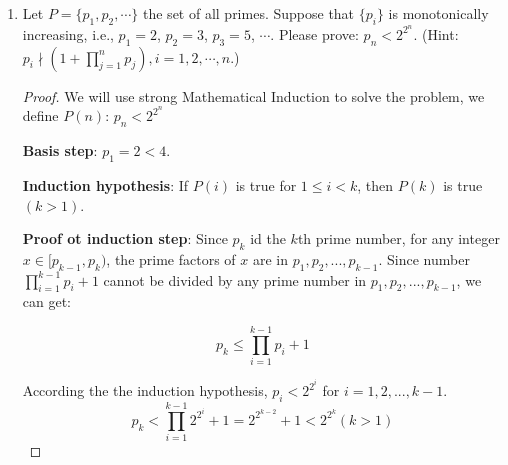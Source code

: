 \documentclass[12pt,a4paper]{article}
\theoremstyle{definition}
\begin{document}
\begin{enumerate}
\begin{proof}
      If $k - 1 \equiv 0(mod 4)$, $j_{k - 1} = 0$, $i_{k - 1} \ge 5$ for $k > 17$, in this case:

      \begin{equation*}
        k = (i_{k - 1} - 5) \times 4 + 3 \times 7
    \end{equation*}

    $i_k = i_{k - 1} - 5 \ge 0$, $j_k = 3$ 
    
    If $k - 1$ can not be divided by $4$, then $j_{k - 1} >= 1$, in this case:

    \begin{equation*}
        k = (i_{k - 1} + 2) \times 4 + (j_{k - 1} - 1) \times 7 
    \end{equation*}

    $i_k = i_{k - 1} + 2 \ge 0$, $j_k = j_{k - 1} - 1 \ge 0$

    So for both cases, $P(k)$ is true. We have derived a contradiction,
    which allows us to conclude that our original assumption is false.


      
    \end{proof}

    \item
    Let $P=\{p_1, p_2, \cdots\}$ the set of all primes. Suppose that $\{p_i\}$ is monotonically    increasing, i.e., $p_1=2$, $p_2=3$, $p_3=5$, $\cdots$. Please prove: $p_n<2^{2^n}$. {\color{blue}(Hint: $p_i \nmid (1+\prod_{j=1}^n p_j), i=1,2,\cdots,n$.)}
    \begin{proof}
       We will use strong Mathematical Induction to solve the problem, we define $P(n)$: $p_n < 2^{2^{n}}$
 
       \textbf{Basis step}: $p_1 = 2 < 4$.

       \textbf{Induction hypothesis}: If $P(i)$ is true for $1 \le i < k$, then $P(k)$ is true$(k > 1)$.

       \textbf{Proof ot induction step}: Since $p_k$ id the $k$th prime number, for any integer $x \in [p_{k - 1}, p_{k})$, the prime factors of $x$ are in 
       ${p_1, p_2, ... , p_{k - 1}}$. Since number $\prod\limits_{i=1}^{k - 1}{p_{i}} + 1$ cannot be divided by any prime number in 
       ${p_1, p_2, ... , p_{k - 1}}$, we can get:

       \begin{equation*}
           p_k \le \prod_{i=1}^{k - 1}{p_i} + 1
       \end{equation*}

       According the the induction hypothesis, $p_{i} < 2^{2^{i}}$ for $i=1, 2, ..., k - 1$. 
       \begin{equation*}
        p_k < \prod_{i=1}^{k - 1}{2^{2^{i}}} + 1 = 2^{2^{k - 2}} + 1 < 2^{2^{k}} (k > 1)
       \end{equation*}


\end{proof}
\end{enumerate}
\end{document}
